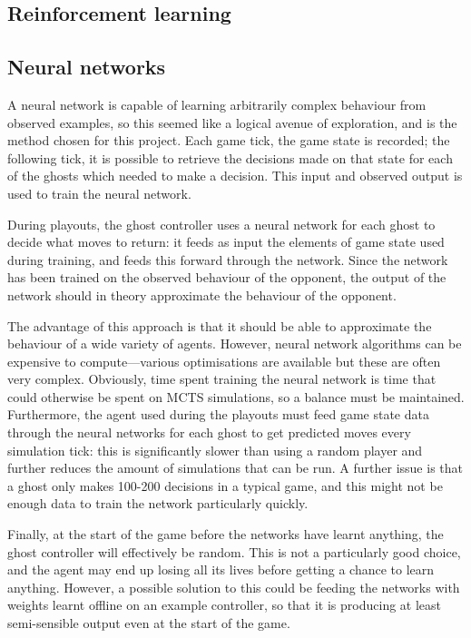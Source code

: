 \subsection{Reinforcement learning}



\subsection{Neural networks}

A neural network is capable of learning arbitrarily complex behaviour from observed examples, so this seemed like a logical avenue of exploration, and is the method chosen for this project.  Each game tick, the game state is recorded; the following tick, it is possible to retrieve the decisions made on that state for each of the ghosts which needed to make a decision.  This input and observed output is used to train the neural network.

During playouts, the ghost controller uses a neural network for each ghost to decide what moves to return: it feeds as input the elements of game state used during training, and feeds this forward through the network.  Since the network has been trained on the observed behaviour of the opponent, the output of the network should in theory approximate the behaviour of the opponent.

The advantage of this approach is that it should be able to approximate the behaviour of a wide variety of agents.  However, neural network algorithms can be expensive to compute---various optimisations are available but these are often very complex.  Obviously, time spent training the neural network is time that could otherwise be spent on MCTS simulations, so a balance must be maintained.  Furthermore, the agent used during the playouts must feed game state data through the neural networks for each ghost to get predicted moves every simulation tick: this is significantly slower than using a random player and further reduces the amount of simulations that can be run.  A further issue is that a ghost only makes 100-200 decisions in a typical game, and this might not be enough data to train the network particularly quickly.

Finally, at the start of the game before the networks have learnt anything, the ghost controller will effectively be random.  This is not a particularly good choice, and the agent may end up losing all its lives before getting a chance to learn anything.  However, a possible solution to this could be feeding the networks with weights learnt offline on an example controller, so that it is producing at least semi-sensible output even at the start of the game.

